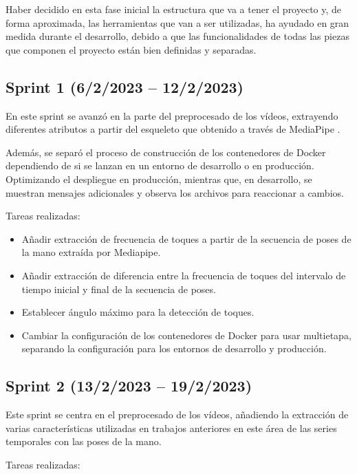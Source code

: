 Haber decidido en esta fase inicial la estructura que va a tener el proyecto y,
de forma aproximada, las herramientas que van a ser utilizadas, ha ayudado en
gran medida durante el desarrollo, debido a que las funcionalidades de todas las
piezas que componen el proyecto están bien definidas y separadas.

\subsection{Sprint 1 (6/2/2023 -- 12/2/2023)}

En este sprint se avanzó en la parte del preprocesado de los vídeos, extrayendo
diferentes atributos a partir del esqueleto que obtenido a través de MediaPipe
\cite{zhang2020mediapipe}.

Además, se separó el proceso de construcción de los contenedores de Docker
dependiendo de si se lanzan en un entorno de desarrollo o en producción.
Optimizando el despliegue en producción, mientras que, en desarrollo, se
muestran mensajes adicionales y observa los archivos para reaccionar a cambios.

Tareas realizadas:

\begin{itemize}
    \item Añadir extracción de frecuencia de toques a partir de la secuencia de
          poses de la mano extraída por Mediapipe.
    \item Añadir extracción de diferencia entre la frecuencia de toques del
          intervalo de tiempo inicial y final de la secuencia de poses.
    \item Establecer ángulo máximo para la detección de toques.
    \item Cambiar la configuración de los contenedores de Docker para usar
          multietapa, separando la configuración para los entornos de desarrollo
          y producción.
\end{itemize}

\subsection{Sprint 2 (13/2/2023 -- 19/2/2023)}

Este sprint se centra en el preprocesado de los vídeos, añadiendo la extracción
de varias características utilizadas en trabajos anteriores en este área de las
series temporales con las poses de la mano.

Tareas realizadas:


